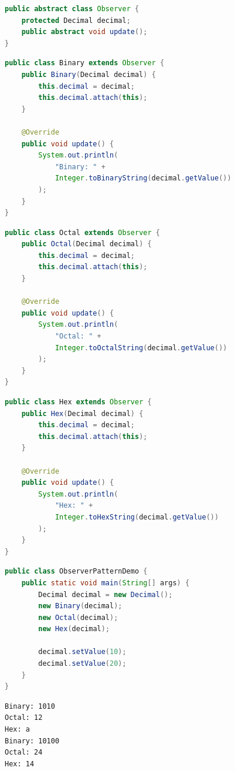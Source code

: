\begin{lstlisting}[language=Java, title=Observer.java]
public abstract class Observer {
    protected Decimal decimal;
    public abstract void update();
}
\end{lstlisting}

\begin{lstlisting}[language=Java, title=Binary.java]
public class Binary extends Observer {
    public Binary(Decimal decimal) {
        this.decimal = decimal;
        this.decimal.attach(this);
    }

    @Override
    public void update() {
        System.out.println(
            "Binary: " +
            Integer.toBinaryString(decimal.getValue())
        );
    }
}
\end{lstlisting}

\begin{lstlisting}[language=Java, title=Octal.java]
public class Octal extends Observer {
    public Octal(Decimal decimal) {
        this.decimal = decimal;
        this.decimal.attach(this);
    }

    @Override
    public void update() {
        System.out.println(
            "Octal: " +
            Integer.toOctalString(decimal.getValue())
        );
    }
}
\end{lstlisting}

\begin{lstlisting}[language=Java, title=Hex.java]
public class Hex extends Observer {
    public Hex(Decimal decimal) {
        this.decimal = decimal;
        this.decimal.attach(this);
    }

    @Override
    public void update() {
        System.out.println(
            "Hex: " +
            Integer.toHexString(decimal.getValue())
        );
    }
}
\end{lstlisting}

\begin{lstlisting}[language=Java, title=ObserverPatternDemo.java]
public class ObserverPatternDemo {
    public static void main(String[] args) {
        Decimal decimal = new Decimal();
        new Binary(decimal);
        new Octal(decimal);
        new Hex(decimal);

        decimal.setValue(10);
        decimal.setValue(20);
    }
}
\end{lstlisting}

\begin{tcolorbox}
    \begin{verbatim}
Binary: 1010
Octal: 12
Hex: a
Binary: 10100
Octal: 24
Hex: 14
\end{verbatim}
\end{tcolorbox}

